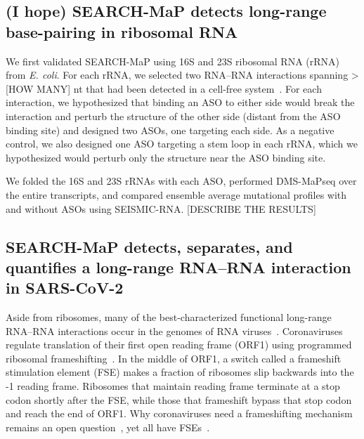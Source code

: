 \documentclass[main.tex]{subfiles}
\begin{document}
\subsection{(I hope) SEARCH-MaP detects long-range base-pairing in ribosomal RNA}

We first validated SEARCH-MaP using 16S and 23S ribosomal RNA (rRNA) from \textit{E. coli}.
For each rRNA, we selected two RNA--RNA interactions spanning > [HOW MANY] nt that had been detected in a cell-free system~\cite{Mustoe2019}.
For each interaction, we hypothesized that binding an ASO to either side would break the interaction and perturb the structure of the other side (distant from the ASO binding site) and designed two ASOs, one targeting each side.
As a negative control, we also designed one ASO targeting a stem loop in each rRNA, which we hypothesized would perturb only the structure near the ASO binding site.

We folded the 16S and 23S rRNAs with each ASO, performed DMS-MaPseq over the entire transcripts, and compared ensemble average mutational profiles with and without ASOs using SEISMIC-RNA.
[DESCRIBE THE RESULTS]

\begin{figure}[H]
	\caption{}
	\label{rrna}
\end{figure}


\subsection{SEARCH-MaP detects, separates, and quantifies a long-range RNA--RNA interaction in SARS-CoV-2}

Aside from ribosomes, many of the best-characterized functional long-range RNA--RNA interactions occur in the genomes of RNA viruses~\cite{Nicholson2014}.
Coronaviruses regulate translation of their first open reading frame (ORF1) using programmed ribosomal frameshifting~\cite{Plant2008}.
In the middle of ORF1, a switch called a frameshift stimulation element (FSE) makes a fraction of ribosomes slip backwards into the -1 reading frame.
Ribosomes that maintain reading frame terminate at a stop codon shortly after the FSE, while those that frameshift bypass that stop codon and reach the end of ORF1.
Why coronaviruses need a frameshifting mechanism remains an open question~\cite{Allan2023}, yet all have FSEs~\cite{Plant2008}.
\end{document}

